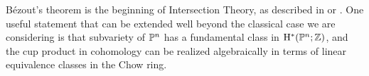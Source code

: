\begin{fact}
B\'ezout's theorem is the beginning of Intersection Theory, as described in \cite{Fulton} or \cite{3264}. One useful statement that can be extended well beyond the classical case we are considering is that
subvariety of $\PP^{n}$ has a fundamental class in $\HH^{*}(\PP^{n}; \ZZ)$, and the cup product in cohomology can be realized algebraically in terms of linear equivalence classes in the Chow ring.
\end{fact}

%
%
%
%
%
%
